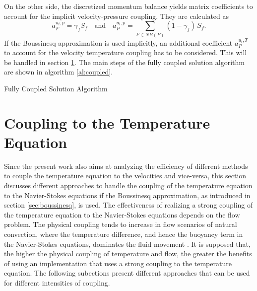 On the other side, the discretized momentum balance yields matrix coefficients to account for the implicit velocity-pressure coupling. They are calculated as
\begin{displaymath}
  a_F^{u_i,p} =  \gamma_f S_f \quad \text{and} \quad a_P^{u_i,p} = \sum_{F \in NB(P)} (1-\gamma_f) \, S_f.
\end{displaymath}
If the Boussinesq approximation is used implicitly, an additional coefficient \(a_P^{u_i,T}\) to account for the velocity temperature coupling has to be considered. This will be handled in section \ref{sec:temperaturecoupling}. The main steps of the fully coupled solution algorithm are shown in algorithm \ref{al:coupled}.

\begin{algorithm}
\label{al:coupled}
\caption{Fully Coupled Solution Algorithm}
\begin{algorithmic}
\Else
\EndIf
{}
\EndIf
\EndWhile
{}
\EndIf
\end{algorithmic}
\end{algorithm}

\section{Coupling to the Temperature Equation}
\label{sec:temperaturecoupling}

Since the present work also aims at analyzing the efficiency of different methods to couple the temperature equation to the velocities and vice-versa, this section discusses different approaches to handle the coupling of the temperature equation to the Navier-Stokes equations if the Boussinesq approximation, as introduced in section \ref{sec:boussinesq}, is used. The effectiveness of realizing a strong coupling of the temperature equation to the Navier-Stokes equations depends on the flow problem. The physical coupling tends to increase in flow scenarios of natural convection, where the temperature difference, and hence the buoyancy term in the Navier-Stokes equations, dominates the fluid movement \cite{ferziger02,vakilipour12}. It is supposed that, the higher the physical coupling of temperature and flow, the greater the benefits of using an implementation that uses a strong coupling to the temperature equation. The following subections present different approaches that can be used for different intensities of coupling.
      
